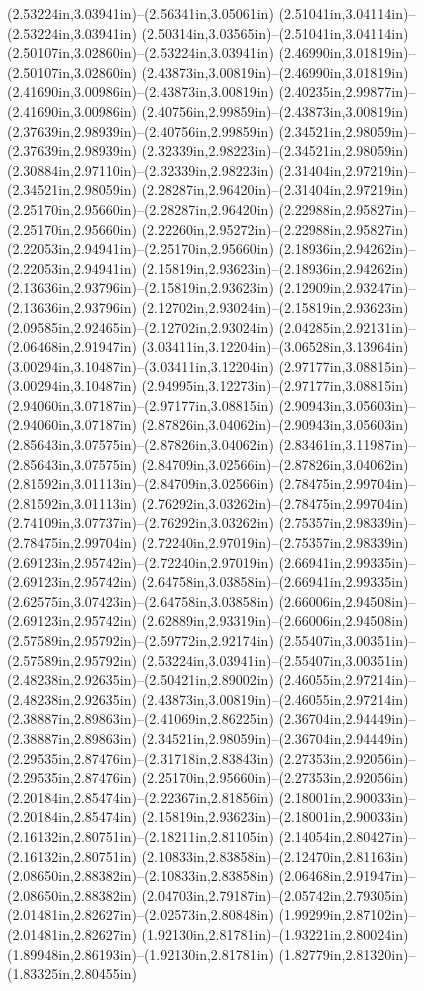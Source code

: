 (2.53224in,3.03941in)--(2.56341in,3.05061in) (2.51041in,3.04114in)--(2.53224in,3.03941in) (2.50314in,3.03565in)--(2.51041in,3.04114in) (2.50107in,3.02860in)--(2.53224in,3.03941in) (2.46990in,3.01819in)--(2.50107in,3.02860in) (2.43873in,3.00819in)--(2.46990in,3.01819in) (2.41690in,3.00986in)--(2.43873in,3.00819in) (2.40235in,2.99877in)--(2.41690in,3.00986in) (2.40756in,2.99859in)--(2.43873in,3.00819in) (2.37639in,2.98939in)--(2.40756in,2.99859in) (2.34521in,2.98059in)--(2.37639in,2.98939in) (2.32339in,2.98223in)--(2.34521in,2.98059in) (2.30884in,2.97110in)--(2.32339in,2.98223in) (2.31404in,2.97219in)--(2.34521in,2.98059in) (2.28287in,2.96420in)--(2.31404in,2.97219in) (2.25170in,2.95660in)--(2.28287in,2.96420in) (2.22988in,2.95827in)--(2.25170in,2.95660in) (2.22260in,2.95272in)--(2.22988in,2.95827in) (2.22053in,2.94941in)--(2.25170in,2.95660in) (2.18936in,2.94262in)--(2.22053in,2.94941in) (2.15819in,2.93623in)--(2.18936in,2.94262in) (2.13636in,2.93796in)--(2.15819in,2.93623in) (2.12909in,2.93247in)--(2.13636in,2.93796in) (2.12702in,2.93024in)--(2.15819in,2.93623in) (2.09585in,2.92465in)--(2.12702in,2.93024in) (2.04285in,2.92131in)--(2.06468in,2.91947in) (3.03411in,3.12204in)--(3.06528in,3.13964in) (3.00294in,3.10487in)--(3.03411in,3.12204in) (2.97177in,3.08815in)--(3.00294in,3.10487in) (2.94995in,3.12273in)--(2.97177in,3.08815in) (2.94060in,3.07187in)--(2.97177in,3.08815in) (2.90943in,3.05603in)--(2.94060in,3.07187in) (2.87826in,3.04062in)--(2.90943in,3.05603in) (2.85643in,3.07575in)--(2.87826in,3.04062in) (2.83461in,3.11987in)--(2.85643in,3.07575in) (2.84709in,3.02566in)--(2.87826in,3.04062in) (2.81592in,3.01113in)--(2.84709in,3.02566in) (2.78475in,2.99704in)--(2.81592in,3.01113in) (2.76292in,3.03262in)--(2.78475in,2.99704in) (2.74109in,3.07737in)--(2.76292in,3.03262in) (2.75357in,2.98339in)--(2.78475in,2.99704in) (2.72240in,2.97019in)--(2.75357in,2.98339in) (2.69123in,2.95742in)--(2.72240in,2.97019in) (2.66941in,2.99335in)--(2.69123in,2.95742in) (2.64758in,3.03858in)--(2.66941in,2.99335in) (2.62575in,3.07423in)--(2.64758in,3.03858in) (2.66006in,2.94508in)--(2.69123in,2.95742in) (2.62889in,2.93319in)--(2.66006in,2.94508in) (2.57589in,2.95792in)--(2.59772in,2.92174in) (2.55407in,3.00351in)--(2.57589in,2.95792in) (2.53224in,3.03941in)--(2.55407in,3.00351in) (2.48238in,2.92635in)--(2.50421in,2.89002in) (2.46055in,2.97214in)--(2.48238in,2.92635in) (2.43873in,3.00819in)--(2.46055in,2.97214in) (2.38887in,2.89863in)--(2.41069in,2.86225in) (2.36704in,2.94449in)--(2.38887in,2.89863in) (2.34521in,2.98059in)--(2.36704in,2.94449in) (2.29535in,2.87476in)--(2.31718in,2.83843in) (2.27353in,2.92056in)--(2.29535in,2.87476in) (2.25170in,2.95660in)--(2.27353in,2.92056in) (2.20184in,2.85474in)--(2.22367in,2.81856in) (2.18001in,2.90033in)--(2.20184in,2.85474in) (2.15819in,2.93623in)--(2.18001in,2.90033in) (2.16132in,2.80751in)--(2.18211in,2.81105in) (2.14054in,2.80427in)--(2.16132in,2.80751in) (2.10833in,2.83858in)--(2.12470in,2.81163in) (2.08650in,2.88382in)--(2.10833in,2.83858in) (2.06468in,2.91947in)--(2.08650in,2.88382in) (2.04703in,2.79187in)--(2.05742in,2.79305in) (2.01481in,2.82627in)--(2.02573in,2.80848in) (1.99299in,2.87102in)--(2.01481in,2.82627in) (1.92130in,2.81781in)--(1.93221in,2.80024in) (1.89948in,2.86193in)--(1.92130in,2.81781in) (1.82779in,2.81320in)--(1.83325in,2.80455in) 